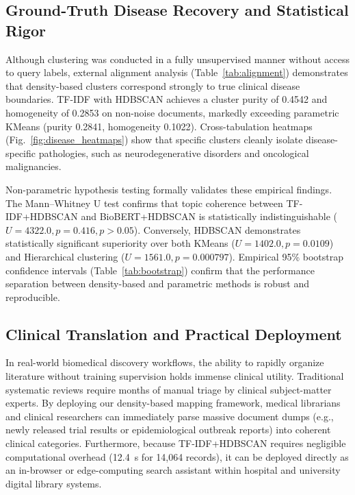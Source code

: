 \documentclass[a4paper,fleqn]{cas-dc}
\begin{document}
\subsection{Ground-Truth Disease Recovery and Statistical Rigor}

Although clustering was conducted in a fully unsupervised manner without access to query labels, external alignment analysis (Table~\ref{tab:alignment}) demonstrates that density-based clusters correspond strongly to true clinical disease boundaries. TF-IDF with HDBSCAN achieves a cluster purity of 0.4542 and homogeneity of 0.2853 on non-noise documents, markedly exceeding parametric KMeans (purity 0.2841, homogeneity 0.1022). Cross-tabulation heatmaps (Fig.~\ref{fig:disease_heatmaps}) show that specific clusters cleanly isolate disease-specific pathologies, such as neurodegenerative disorders and oncological malignancies.

Non-parametric hypothesis testing formally validates these empirical findings. The Mann--Whitney U test confirms that topic coherence between TF-IDF+HDBSCAN and BioBERT+HDBSCAN is statistically indistinguishable ($U = 4322.0, p = 0.416, p > 0.05$). Conversely, HDBSCAN demonstrates statistically significant superiority over both KMeans ($U = 1402.0, p = 0.0109$) and Hierarchical clustering ($U = 1561.0, p = 0.000797$). Empirical 95\% bootstrap confidence intervals (Table~\ref{tab:bootstrap}) confirm that the performance separation between density-based and parametric methods is robust and reproducible.

\subsection{Clinical Translation and Practical Deployment}

In real-world biomedical discovery workflows, the ability to rapidly organize literature without training supervision holds immense clinical utility. Traditional systematic reviews require months of manual triage by clinical subject-matter experts. By deploying our density-based mapping framework, medical librarians and clinical researchers can immediately parse massive document dumps (e.g., newly released trial results or epidemiological outbreak reports) into coherent clinical categories. Furthermore, because TF-IDF+HDBSCAN requires negligible computational overhead (12.4~s for 14,064 records), it can be deployed directly as an in-browser or edge-computing search assistant within hospital and university digital library systems.
\end{document}

